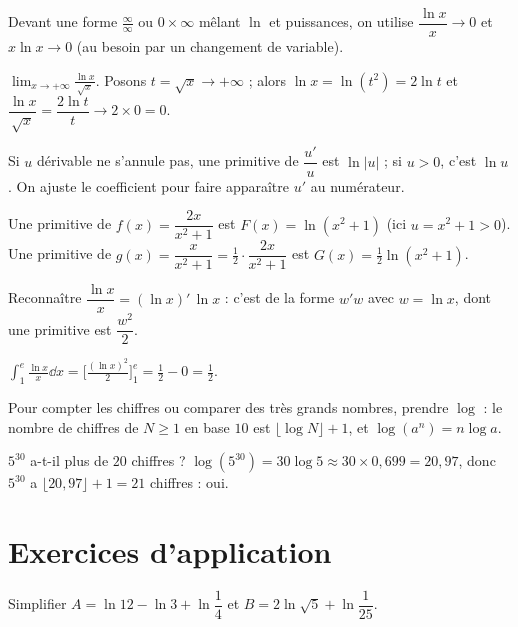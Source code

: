 Devant une forme $\frac{\infty}{\infty}$ ou $0\times\infty$ mêlant $\ln$ et puissances,
on utilise $\dfrac{\ln x}{x}\to0$ et $x\ln x\to0$ (au besoin par un changement de variable).
\begin{exemple}
$\displaystyle\lim_{x\to+\infty}\frac{\ln x}{\sqrt x}$. Posons $t=\sqrt x\to+\infty$ ;
alors $\ln x=\ln(t^{2})=2\ln t$ et $\dfrac{\ln x}{\sqrt x}=\dfrac{2\ln t}{t}\to2\times0=0$.
\end{exemple}

Si $u$ dérivable ne s'annule pas, une primitive de $\dfrac{u'}{u}$ est $\ln|u|$ ; si $u>0$,
c'est $\ln u$. On ajuste le coefficient pour faire apparaître $u'$ au numérateur.
\begin{exemple}
Une primitive de $f(x)=\dfrac{2x}{x^{2}+1}$ est $F(x)=\ln(x^{2}+1)$ (ici $u=x^{2}+1>0$).
Une primitive de $g(x)=\dfrac{x}{x^{2}+1}=\tfrac12\cdot\dfrac{2x}{x^{2}+1}$ est
$G(x)=\tfrac12\ln(x^{2}+1)$.
\end{exemple}

Reconnaître $\dfrac{\ln x}{x}=(\ln x)'\,\ln x$ : c'est de la forme $w'w$ avec $w=\ln x$, dont
une primitive est $\dfrac{w^2}2$.
\begin{exemple}
$\displaystyle\int_{1}^{e}\frac{\ln x}{x}\dd x=\Big[\frac{(\ln x)^{2}}{2}\Big]_{1}^{e}
=\frac{1}{2}-0=\frac12$.
\end{exemple}

Pour compter les chiffres ou comparer des très grands nombres, prendre $\log$ : le nombre
de chiffres de $N\ge1$ en base $10$ est $\lfloor\log N\rfloor+1$, et $\log(a^n)=n\log a$.
\begin{exemple}
$5^{30}$ a-t-il plus de $20$ chiffres ? $\log(5^{30})=30\log 5\approx30\times0{,}699=20{,}97$,
donc $5^{30}$ a $\lfloor20{,}97\rfloor+1=21$ chiffres : oui.
\end{exemple}

\section{Exercices d'application}

\exo{} Simplifier $A=\ln 12-\ln 3+\ln\dfrac14$ et $B=2\ln\sqrt5+\ln\dfrac1{25}$.

